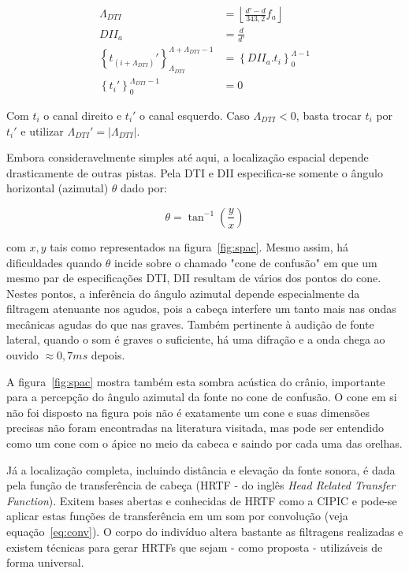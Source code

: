 \begin{equation}\label{eq:locImpl}
\begin{split}
\Lambda_{DTI} & = \left \lfloor \frac{d'-d}{343,2}  f_a \right \rfloor \\
DII_a & = \frac{d}{d'} \\
\left\{t_{(i+\Lambda_{DTI})}'\right\}_{\Lambda_{DTI}}^{\Lambda+\Lambda_{DTI}-1} & =\left\{DII_a . t_i\right\}_0^{\Lambda-1} \\
\left\{t_i'\right\}_0^{\Lambda_{DTI}-1} & = 0
\end{split}
\end{equation}

Com $t_i$ o canal direito e $t_i'$ o canal esquerdo. Caso $\Lambda_{DTI} < 0 $, basta trocar $t_i$ por $t_i'$  e utilizar $\Lambda_{DTI}'= | \Lambda_{DTI} | $.

Embora consideravelmente simples até aqui, a localização espacial depende drasticamente de outras pistas. Pela
DTI e DII especifica-se somente o ângulo horizontal (azimutal) $\theta$ dado por:

\begin{equation}\label{eq:angulo}
\theta=\tan^{-1}\left ( \frac{y}{ x }  \right )
\end{equation}

com $x,y$ tais como representados na figura~\ref{fig:spac}. Mesmo assim, há dificuldades quando $\theta$ incide sobre o chamado "cone de confusão" em que um mesmo par de especificações DTI, DII resultam de vários dos pontos 
do cone. Nestes pontos, a inferência do ângulo azimutal depende especialmente da filtragem atenuante nos agudos, pois a cabeça interfere um tanto mais nas ondas mecânicas agudas do que nas graves.\cite{Heeger,hrtf}  Também pertinente à audição de fonte lateral, quando o som é graves o suficiente, há uma difração e a onda chega ao ouvido $\approx 0,7ms$ depois.\cite{floEsp}

A figura~\ref{fig:spac} mostra também esta sombra acústica do crânio, importante para a percepção do ângulo azimutal da fonte no cone de confusão. O cone em si não foi disposto na figura pois não é exatamente um cone e suas dimensões precisas não foram encontradas na literatura visitada, mas pode ser entendido como um cone com o ápice no meio da cabeca e saindo por cada uma das orelhas.\cite{hrtf}

Já a localização completa, incluindo distância e elevação da fonte sonora, é dada pela função de transferência de cabeça (HRTF - do inglês \emph{Head Related Transfer Function}).\cite{hrtf} Exitem bases abertas e conhecidas de HRTF como a CIPIC e pode-se aplicar estas funções de transferência em um som por convolução (veja equação~\ref{eq:conv}).\cite{CIPIC} O corpo do indivíduo altera bastante as filtragens realizadas e existem técnicas para gerar HRTFs que sejam - como proposta - utilizáveis de forma universal.\cite{lazaSPA} 

